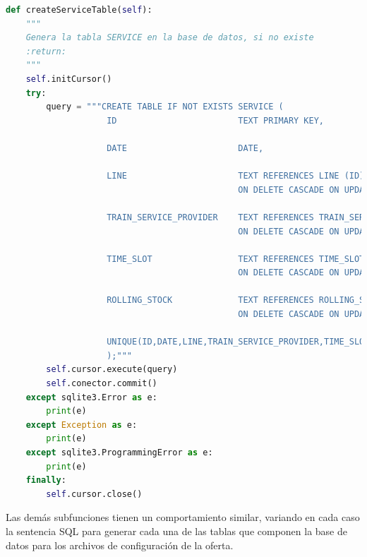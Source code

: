\begin{lstlisting}[language=Python,
                   style=python,
                   frame=none,
                   numbers=none,
                   basicstyle=\ttfamily\normalsize,
                   caption={Función \texttt{createServiceTable}},
                   label=src:functionCreateServiceTable,
                   inputencoding=utf8]                   
def createServiceTable(self):
    """
    Genera la tabla SERVICE en la base de datos, si no existe
    :return:
    """
    self.initCursor()
    try:
        query = """CREATE TABLE IF NOT EXISTS SERVICE (
                    ID                        TEXT PRIMARY KEY,
            
                    DATE                      DATE,
                    
                    LINE                      TEXT REFERENCES LINE (ID) 
                                              ON DELETE CASCADE ON UPDATE CASCADE,
                                                                        
                    TRAIN_SERVICE_PROVIDER    TEXT REFERENCES TRAIN_SERVICE_PROVIDER (ID) 
                                              ON DELETE CASCADE ON UPDATE CASCADE,
                                                                                          
                    TIME_SLOT                 TEXT REFERENCES TIME_SLOT (ID) 
                                              ON DELETE CASCADE ON UPDATE CASCADE,
                                                                             
                    ROLLING_STOCK             TEXT REFERENCES ROLLING_STOCK (ID) 
                                              ON DELETE CASCADE ON UPDATE CASCADE,
                                                                                 
                    UNIQUE(ID,DATE,LINE,TRAIN_SERVICE_PROVIDER,TIME_SLOT,ROLLING_STOCK)
                    );"""
        self.cursor.execute(query)
        self.conector.commit()
    except sqlite3.Error as e:
        print(e)
    except Exception as e:
        print(e)
    except sqlite3.ProgrammingError as e:
        print(e)
    finally:
        self.cursor.close()
\end{lstlisting}

Las demás subfunciones tienen un comportamiento similar, variando en cada caso la sentencia \acrshort{SQL} para generar cada una de las tablas que componen la base de datos para los archivos de configuración de la oferta.

